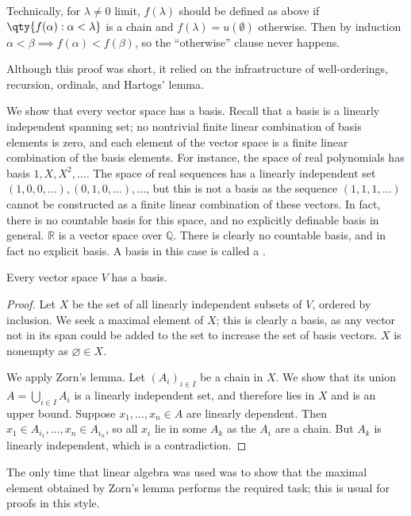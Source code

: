 \begin{remark}
    Technically, for $\lambda \neq 0$ limit, $f(\lambda)$ should be defined as above if $\qty{f(\alpha) : \alpha < \lambda}$ is a chain and $f(\lambda) = u(\emptyset)$ otherwise.
    Then by induction $\alpha < \beta \implies f(\alpha) < f(\beta)$, so the ``otherwise'' clause never happens.
\end{remark}

\begin{remark}
    Although this proof was short, it relied on the infrastructure of well-orderings, recursion, ordinals, and Hartogs' lemma.
\end{remark}

We show that every vector space has a basis.
Recall that a basis is a linearly independent spanning set; no nontrivial finite linear combination of basis elements is zero, and each element of the vector space is a finite linear combination of the basis elements.
For instance, the space of real polynomials has basis $1, X, X^2, \dots$.
The space of real sequences has a linearly independent set $(1, 0, 0, \dots), (0, 1, 0, \dots), \dots$, but this is not a basis as the sequence $(1, 1, 1, \dots)$ cannot be constructed as a finite linear combination of these vectors.
In fact, there is no countable basis for this space, and no explicitly definable basis in general.
$\mathbb R$ is a vector space over $\mathbb Q$.
There is clearly no countable basis, and in fact no explicit basis.
A basis in this case is called a .
\begin{theorem}
    Every vector space $V$ has a basis.
\end{theorem}
\begin{proof}
    Let $X$ be the set of all linearly independent subsets of $V$, ordered by inclusion.
    We seek a maximal element of $X$; this is clearly a basis, as any vector not in its span could be added to the set to increase the set of basis vectors.
    $X$ is nonempty as $\varnothing \in X$.

    We apply Zorn's lemma.
    Let $(A_i)_{i \in I}$ be a chain in $X$.
    We show that its union $A = \bigcup_{i \in I} A_i$ is a linearly independent set, and therefore lies in $X$ and is an upper bound.
    Suppose $x_1, \dots, x_n \in A$ are linearly dependent.
    Then $x_1 \in A_{i_1}, \dots, x_n \in A_{i_n}$, so all $x_i$ lie in some $A_k$ as the $A_i$ are a chain.
    But $A_k$ is linearly independent, which is a contradiction.
\end{proof}
\begin{remark}
    The only time that linear algebra was used was to show that the maximal element obtained by Zorn's lemma performs the required task; this is usual for proofs in this style.
\end{remark}
